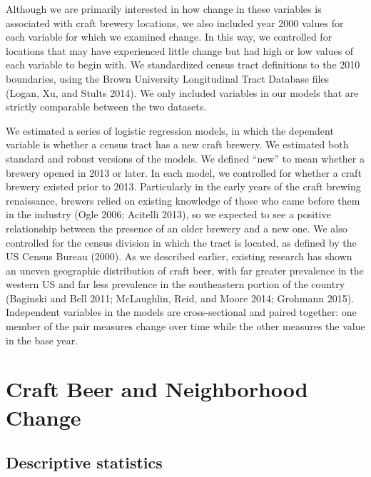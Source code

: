 \documentclass[]{article}
\begin{document}
Although we are primarily interested in how change in these variables is
associated with craft brewery locations, we also included year 2000
values for each variable for which we examined change. In this way, we
controlled for locations that may have experienced little change but had
high or low values of each variable to begin with. We standardized
census tract definitions to the 2010 boundaries, using the Brown
University Longitudinal Tract Database files (Logan, Xu, and Stults
2014). We only included variables in our models that are strictly
comparable between the two datasets.

We estimated a series of logistic regression models, in which the
dependent variable is whether a census tract has a new craft brewery. We
estimated both standard and robust versions of the models. We defined
``new'' to mean whether a brewery opened in 2013 or later. In each
model, we controlled for whether a craft brewery existed prior to 2013.
Particularly in the early years of the craft brewing renaissance,
brewers relied on existing knowledge of those who came before them in
the industry (Ogle 2006; Acitelli 2013), so we expected to see a
positive relationship between the presence of an older brewery and a new
one. We also controlled for the census division in which the tract is
located, as defined by the US Census Bureau (2000). As we described
earlier, existing research has shown an uneven geographic distribution
of craft beer, with far greater prevalence in the western US and far
less prevalence in the southeastern portion of the country (Baginski and
Bell 2011; McLaughlin, Reid, and Moore 2014; Grohmann 2015). Independent
variables in the models are cross-sectional and paired together: one
member of the pair measures change over time while the other measures
the value in the base year.

\section{Craft Beer and Neighborhood
Change}\label{craft-beer-and-neighborhood-change}

\subsection{Descriptive statistics}\label{descriptive-statistics}
\end{document}
